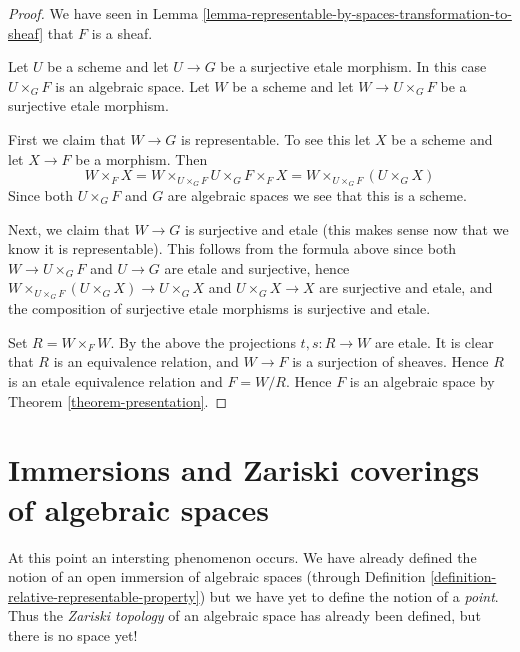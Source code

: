 \begin{proof}
We have seen in
Lemma \ref{lemma-representable-by-spaces-transformation-to-sheaf}
that $F$ is a sheaf.

\medskip\noindent
Let $U$ be a scheme and let $U \to G$ be a surjective etale morphism.
In this case $U \times_G F$ is an algebraic space. Let $W$ be a scheme
and let $W \to U \times_G F$ be a surjective etale morphism.

\medskip\noindent
First we claim that $W \to G$ is representable.
To see this let $X$ be a scheme and let $X \to F$ be a morphism.
Then
$$
W \times_F X = W \times_{U \times_G F} U \times_G F \times_F X
= W \times_{U \times_G F} (U \times_G X)
$$
Since both $U \times_G F$ and $G$ are algebraic spaces we see that
this is a scheme.

\medskip\noindent
Next, we claim that $W \to G$ is surjective and etale (this makes
sense now that we know it is representable). This follows from the
formula above since both $W \to U \times_G F$ and $U \to G$
are etale and surjective, hence
$W \times_{U \times_G F} (U \times_G X) \to U \times_G X$ and
$U \times_G X \to X$ are surjective and etale, and the composition of
surjective etale morphisms is surjective and etale.

\medskip\noindent
Set $R = W \times_F W$. By the above the projections $t, s : R \to W$
are etale. It is clear that $R$ is an equivalence relation, and
$W \to F$ is a surjection of sheaves. Hence $R$ is an etale equivalence
relation and $F = W/R$. Hence $F$ is an algebraic space by
Theorem \ref{theorem-presentation}.
\end{proof}
















\section{Immersions and Zariski coverings of algebraic spaces}
\label{section-Zariski}

\noindent
At this point an intersting phenomenon occurs. We have already defined
the notion of an open immersion of algebraic spaces (through
Definition \ref{definition-relative-representable-property})
but we have yet to define the notion of a {\it point}.
Thus the {\it Zariski topology} of an algebraic space
has already been defined, but there is no space yet!

